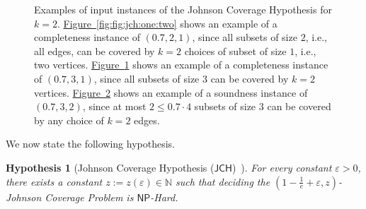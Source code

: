 \documentclass[11pt]{article}
\newtheorem{hypothesis}[theorem]{Hypothesis}
\newcommand{\namedref}[2]{\hyperref[#2]{#1~\ref*{#2}}}
\newcommand{\figlab}[1]{\label{fig:#1}}
\newcommand{\figref}[1]{\namedref{Figure}{fig:#1}}
\newcommand{\hyplab}[1]{\label{hyp:#1}}
\newcommand{\JCH}{$\mathsf{JCH}$\xspace}
\newcommand{\NP}{$\mathsf{NP}$\xspace}
\begin{document}
\begin{figure}[!htb]
\begin{subfigure}[b]{0.3\textwidth}
\caption{}
\figlab{fig:jch:one:three}
\end{subfigure}
\begin{subfigure}[b]{0.3\textwidth}
\centering
{}
\caption{}
\figlab{fig:jch:two:three}
\end{subfigure}
\caption{Examples of input instances of the Johnson Coverage Hypothesis for $k=2$. 
\figref{fig:jch:one:two} shows an example of a completeness instance of $\left(0.7,2,1\right)$, since all subsets of size $2$, i.e., all edges, can be covered by $k=2$ choices of subset of size $1$, i.e., two vertices.
\figref{fig:jch:one:three} shows an example of a completeness instance of $\left(0.7,3,1\right)$, since all subsets of size $3$ can be covered by $k=2$ vertices. 
\figref{fig:jch:two:three} shows an example of a soundness instance of $\left(0.7,3,2\right)$, since at most $2\le 0.7\cdot 4$ subsets of size $3$ can be covered by any choice of $k=2$ edges.  
}
\figlab{fig:jch}
\end{figure}

We now state the following hypothesis. 

\begin{hypothesis}[Johnson Coverage Hypothesis (\JCH)~\cite{Cohen-AddadSL22}]\hyplab{hyp:jch}
For every constant $\varepsilon>0$, there exists a constant $z:=z(\varepsilon)\in\mathbb{N}$ such that deciding the $\left(1-\frac{1}{e}+\varepsilon,z\right)$-Johnson Coverage Problem is \NP-Hard. 
\end{hypothesis}
\end{document}

